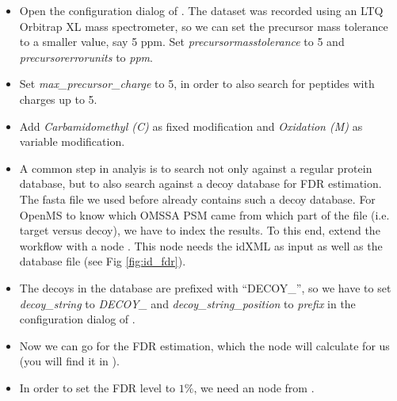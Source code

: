 \begin{itemize}
\item
Open the configuration dialog of .
The dataset was recorded using an LTQ Orbitrap XL mass spectrometer, so we can set the precursor mass tolerance to a smaller value, say 5 ppm.
Set \textit{precursor\textunderscore mass\textunderscore tolerance} to 5 and \\ \textit{precursor\textunderscore error\textunderscore units} to \textit{ppm}.
\item
Set \textit{max\_precursor\_charge} to 5, in order to also search for peptides with charges up to 5.
\item
Add \textit{Carbamidomethyl (C)} as fixed modification and \textit{Oxidation (M)} as variable modification.
\item
A common step in analyis is to search not only against a regular protein database, but to also search against a decoy database for FDR estimation.
The fasta file we used before already contains such a decoy database.
For OpenMS to know which OMSSA PSM came from which part of the file (i.e. target versus decoy), we have to index the results.
To this end, extend the workflow with a  node .
This node needs the idXML as input as well as the database file (see Fig \ref{fig:id_fdr}).
\item
The decoys in the database are prefixed with ``DECOY\_'', so we have to set \textit{decoy\_string} to \textit{DECOY\_} and \textit{decoy\_string\_position} to \textit{prefix} in the configuration dialog of .
\item
Now we can go for the FDR estimation, which the  node will calculate for us (you will find it in ).
\item
In order to set the FDR level to $1\%$, we need an  node from .

\end{itemize}
